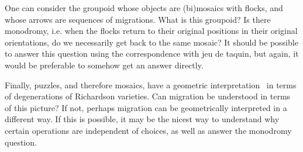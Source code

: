 \documentclass[12pt]{article}
\begin{document}

One can consider the groupoid whose objects are 
(bi)mosaics with flocks, and whose arrows are sequences of migrations.
What is this groupoid?  Is there monodromy, i.e. when the flocks return 
to their original positions in their original orientations, do we
necessarily get back to the same mosaic?  It should be possible to
answer this question using the correspondence with jeu de taquin,
but again, it would be preferable to somehow get an answer 
directly.

Finally, puzzles, and therefore mosaics, have a geometric 
interpretation~\cite{vakil} in terms of degenerations of Richardson 
varieties.  Can migration be understood in terms of this picture?
If not, perhaps migration can be geometrically interpreted in
a different way.  If this is possible, it may be the nicest way
to understand why certain operations are independent of choices,
as well as answer the monodromy question.
\end{document}
